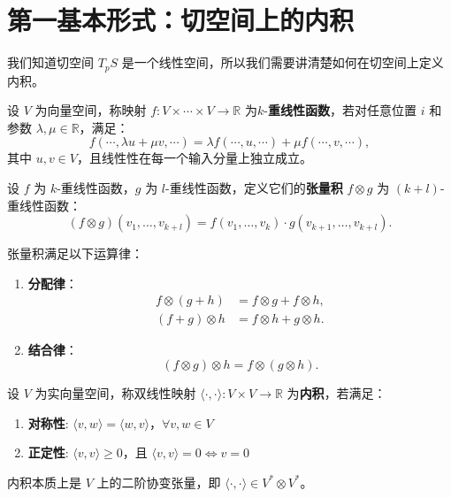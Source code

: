 \documentclass[lang=cn,10pt,thmcnt=section]{elegantbook}
\begin{document}
\section{第一基本形式：切空间上的内积}
我们知道切空间 $T_p S$ 是一个线性空间，所以我们需要讲清楚如何在切空间上定义内积。
\begin{definition}[多线性函数]
    设 $V$ 为向量空间，称映射 $f: V \times \cdots \times V \to \mathbb{R}$ 为$k$-\textbf{重线性函数}，若对任意位置 $i$ 和参数 $\lambda, \mu \in \mathbb{R}$，满足：
\[
f(\cdots, \lambda u + \mu v, \cdots) = \lambda f(\cdots, u, \cdots) + \mu f(\cdots, v, \cdots),
\]
其中 $u, v \in V$，且线性性在每一个输入分量上独立成立。
\end{definition}
\begin{definition}[张量积]
    设 $f$ 为 $k$-重线性函数，$g$ 为 $l$-重线性函数，定义它们的\textbf{张量积} $f \otimes g$ 为 $(k+l)$-重线性函数：
    \[
    (f \otimes g)(v_1, \ldots, v_{k+l}) = f(v_1, \ldots, v_k) \cdot g(v_{k+1}, \ldots, v_{k+l}).
    \] 
\end{definition}
\begin{proposition}
    张量积满足以下运算律：
\begin{enumerate}
\item \textbf{分配律}：
\[
\begin{aligned}
f \otimes (g + h) &= f \otimes g + f \otimes h, \\
(f + g) \otimes h &= f \otimes h + g \otimes h.
\end{aligned}
\]
\item \textbf{结合律}：
\[
(f \otimes g) \otimes h = f \otimes (g \otimes h).
\]
\end{enumerate}
\end{proposition}
\begin{definition}[内积]
    设 $V$ 为实向量空间，称双线性映射 $\langle \cdot, \cdot \rangle: V \times V \to \mathbb{R}$ 为\textbf{内积}，若满足：
    \begin{enumerate}
    \item \textbf{对称性}: $\langle v, w \rangle = \langle w, v \rangle$，$\forall v,w \in V$
    \item \textbf{正定性}: $\langle v, v \rangle \geq 0$，且 $\langle v, v \rangle = 0 \iff v = 0$
    \end{enumerate}
\end{definition}
\begin{proposition}[内积的张量积表示]
    内积本质上是 $V$ 上的二阶协变张量，即 $\langle \cdot, \cdot \rangle \in V^* \otimes V^*$。
    \end{proposition}
    
\end{document}
